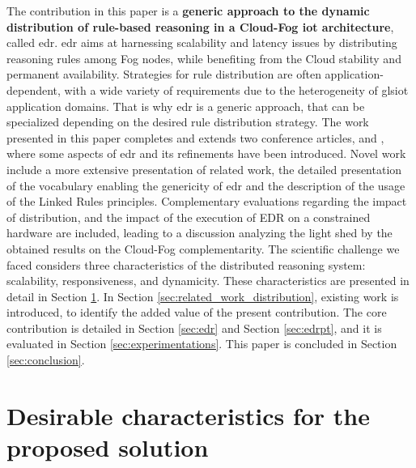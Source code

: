 \documentclass{iosart2c}
\newcommand{\edr}{EDR\xspace}
\begin{document}
The contribution in this paper is a \textbf{generic approach to the dynamic distribution of rule-based reasoning in a Cloud-Fog \gls{iot} architecture}, called \gls{edr}.
\gls{edr} aims at harnessing scalability and latency issues by distributing reasoning rules among Fog nodes, while benefiting from the Cloud stability and permanent availability. 
Strategies for rule distribution are often application-dependent, with a wide variety of requirements due to the heterogeneity of gls{iot} application domains.
That is why \gls{edr} is a generic approach, that can be specialized depending on the desired rule distribution strategy.
The work presented in this paper completes and extends two conference articles, \cite{wi2018} and \cite{coopis2018}, where some aspects of \gls{edr} and its refinements have been introduced.
Novel work include a more extensive presentation of related work, the detailed presentation of the vocabulary enabling the genericity of \gls{edr} and the description of the usage of the Linked Rules \cite{Khandelwal2011} principles. 
Complementary evaluations regarding the impact of distribution, and the impact of the execution of \edr on a constrained hardware are included, leading to a discussion analyzing the light shed by the obtained results on the Cloud-Fog complementarity. 
The scientific challenge we faced considers three characteristics of the distributed reasoning system: scalability, responsiveness, and dynamicity. 
These characteristics are presented in detail in Section \textsection \ref{sec:edr_characteristics}.
In Section \textsection \ref{sec:related_work_distribution}, existing work is introduced, to identify the added value of the present contribution.
The core contribution is detailed in Section \textsection \ref{sec:edr} and Section \textsection \ref{sec:edrpt}, and it is evaluated in Section \textsection \ref{sec:experimentations}.
This paper is concluded in Section \textsection \ref{sec:conclusion}.

\section{Desirable characteristics for the proposed solution}
\label{sec:edr_characteristics}
\end{document}
